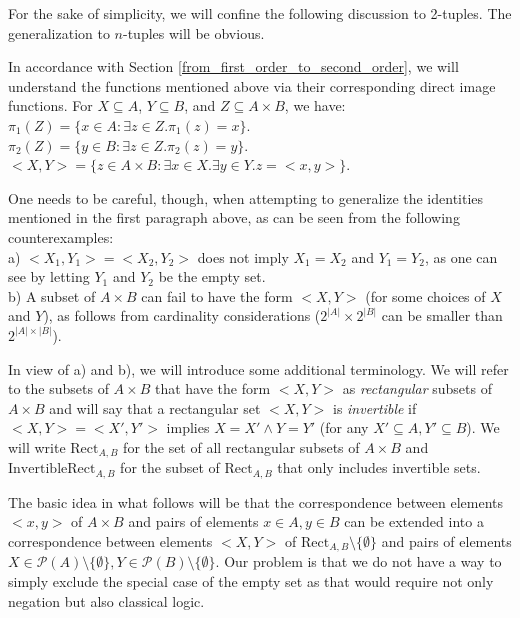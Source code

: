 \documentclass[12pt]{book}
\begin{document}
For the sake of simplicity, we will confine the following discussion to 2-tuples. The generalization to $n$-tuples will be obvious.

In accordance with Section \ref{from_first_order_to_second_order}, we will understand the functions mentioned above via their corresponding direct image functions. For $X \subseteq A$, $Y \subseteq B$, and $Z \subseteq A \times B$, we have:\\
\indent * $\pi_1(Z) = \{x \in A: \exists z \in Z.\pi_1(z) = x\}$.\\
\indent * $\pi_2(Z) = \{y \in B: \exists z \in Z.\pi_2(z) = y\}$.\\
\indent * $<X, Y> = \{z \in A \times B: \exists x \in X.\exists y \in Y. z = <x, y>\}$.

One needs to be careful, though, when attempting to generalize the identities mentioned in the first paragraph above, as can be seen from the following counterexamples:\\
\indent a) $<X_1, Y_1> = <X_2, Y_2>$ does not imply $X_1 = X_2$ and $Y_1 = Y_2$, as one can see by letting $Y_1$ and $Y_2$ be the empty set.\\
\indent b) A subset of $A \times B$ can fail to have the form $<X, Y>$ (for some choices of $X$ and $Y$), as follows from cardinality considerations ($2^{|A|} \times 2^{|B|}$ can be smaller than $2^{|A| \times |B|}$).

In view of a) and b), we will introduce some additional terminology. We will refer to the subsets of $A \times B$ that have the form $<X, Y>$ as \textit{rectangular} subsets of $A \times B$ and will say that a rectangular set $<X, Y>$ is \textit{invertible} if $<X, Y> = <X', Y'>$ implies $X = X' \wedge Y = Y'$ (for any $X' \subseteq A, Y' \subseteq B$). We will write $\mathrm{Rect}_{A, B}$ for the set of all rectangular subsets of $A \times B$ and $\mathrm{InvertibleRect}_{A, B}$ for the subset of $\mathrm{Rect}_{A, B}$ that only includes invertible sets.

The basic idea in what follows will be that the correspondence between elements $<x, y>$ of $A \times B$ and pairs of elements $x \in A, y \in B$ can be extended into a correspondence between elements $<X, Y>$ of $\mathrm{Rect}_{A, B} \setminus \{\emptyset\}$ and pairs of elements $X \in \mathcal{P}(A) \setminus \{\emptyset\}, Y \in \mathcal{P}(B) \setminus \{\emptyset\}$. Our problem is that we do not have a way to simply exclude the special case of the empty set as that would require not only negation but also classical logic.
\end{document}
